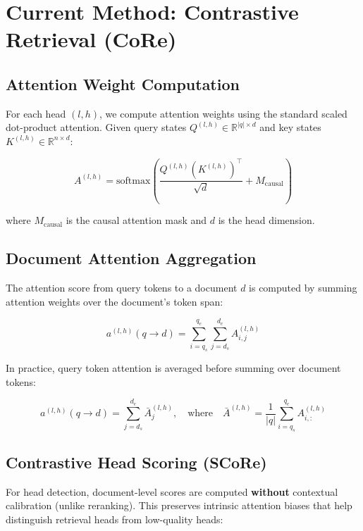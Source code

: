 \documentclass[11pt,a4paper]{article}
\begin{document}
\section{Current Method: Contrastive Retrieval (CoRe)}

\subsection{Attention Weight Computation}

For each head $(l, h)$, we compute attention weights using the standard scaled dot-product attention. Given query states $Q^{(l,h)} \in \mathbb{R}^{|q| \times d}$ and key states $K^{(l,h)} \in \mathbb{R}^{n \times d}$:

\begin{equation}
    A^{(l,h)} = \text{softmax}\left(\frac{Q^{(l,h)} (K^{(l,h)})^\top}{\sqrt{d}} + M_{\text{causal}}\right)
\end{equation}

where $M_{\text{causal}}$ is the causal attention mask and $d$ is the head dimension.

\subsection{Document Attention Aggregation}

The attention score from query tokens to a document $d$ is computed by summing attention weights over the document's token span:

\begin{equation}
    a^{(l,h)}(q \rightarrow d) = \sum_{i=q_s}^{q_e} \sum_{j=d_s}^{d_e} A^{(l,h)}_{i,j}
\end{equation}

In practice, query token attention is averaged before summing over document tokens:

\begin{equation}
    a^{(l,h)}(q \rightarrow d) = \sum_{j=d_s}^{d_e} \bar{A}^{(l,h)}_{j}, \quad \text{where} \quad \bar{A}^{(l,h)} = \frac{1}{|q|} \sum_{i=q_s}^{q_e} A^{(l,h)}_{i,:}
\end{equation}

\subsection{Contrastive Head Scoring (SCoRe)}

For head detection, document-level scores are computed \textbf{without} contextual calibration (unlike reranking). This preserves intrinsic attention biases that help distinguish retrieval heads from low-quality heads:
\end{document}
